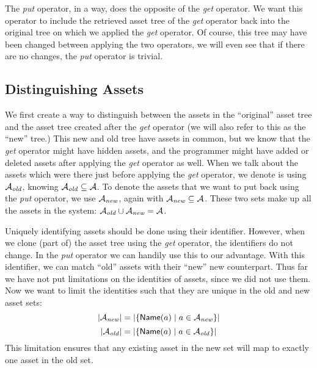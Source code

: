 The \emph{put} operator, in a way, does the opposite of the \emph{get} 
operator. We want this operator to include the retrieved asset tree of the
\emph{get} operator back into the original tree on which we applied the
\emph{get} operator. Of course, this tree may have been changed between applying
the two operators, we will even see that if there are no changes, the
\emph{put} operator is trivial.

\subsection*{Distinguishing Assets}
We first create a way to distinguish between the assets in the ``original''
asset tree and the asset tree created after the \emph{get} operator (we will
also refer to this as the ``new'' tree.) This new and old tree have assets in
common, but we know that the \emph{get} operator might have hidden assets, and
the programmer might have added or deleted assets after applying the \emph{get}
operator as well. When we talk about the assets which were there just before
applying the \emph{get} operator, we denote is using \(\mathcal{A}_{\it old}\), knowing
\(\mathcal{A}_{\it old} \subseteq \mathcal{A}\). To denote the assets that we want to put
back using the \emph{put} operator, we use \(\mathcal{A}_{\it new}\), again with
\(\mathcal{A}_{\it new} \subseteq \mathcal{A}\). These two sets make up all the assets in
the system: \(\mathcal{A}_{\it old} \cup \mathcal{A}_{\it new} = \mathcal{A}\).

Uniquely identifying assets should be done using their identifier. However,
when we clone (part of) the asset tree using the \emph{get} operator, the
identifiers do not change. In the \emph{put} operator we can handily use this
to our advantage. With this identifier, we can match ``old'' assets with their
``new'' new counterpart. Thus far we have not put limitations on the identities
of assets, since we did not use them. Now we want to limit the identities such
that they are unique in the old and new asset sets:
\[
  \left| \mathcal{A}_{\it new} \right| = \left| \left\{ {\sf Name}(a) \hspace*{1mm}\middle|\hspace*{1mm} a \in \mathcal{A}_{\it new} \right\} \right|
\]
\[
  \left| \mathcal{A}_{\it old} \right| = \left| \left\{ {\sf Name}(a) \hspace*{1mm}\middle|\hspace*{1mm} a \in \mathcal{A}_{\it old} \right\} \right|
\]
This limitation ensures that any existing asset in the new set will map to
exactly one asset in the old set.

